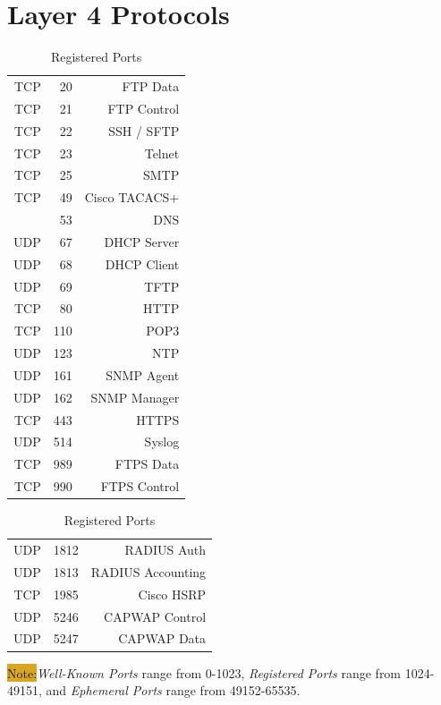 \documentclass[12pt]{article}
\newcommand{\note}[1]{\colorbox{#1}{Note:}}
\begin{document}
\section{Layer 4 Protocols \label{sec:L4}}
	\begin{table}[H]
	\begin{minipage}{.45\linewidth}
	\centering
	\caption{Well-Known Ports \label{tab:L4 PORTS KNOWN}}
	\begin{tabular}{| rr | r |}
	\hline
	TCP	& 20		& FTP Data\\
	TCP	& 21		& FTP Control\\\hline
	TCP	& 22		& SSH / SFTP\\\hline
	TCP	& 23		& Telnet\\\hline
	TCP	& 25		& SMTP\\\hline
	TCP	& 49		& Cisco TACACS+\\\hline
	       	& 53		& DNS\\\hline
	UDP	& 67		& DHCP Server\\
	UDP	& 68		& DHCP Client\\\hline
	UDP	& 69		& TFTP\\\hline
	TCP	& 80		& HTTP\\\hline
	TCP	& 110		& POP3\\\hline
	UDP	& 123		& NTP\\\hline
	UDP	& 161		& SNMP Agent\\
	UDP	& 162		& SNMP Manager\\\hline
	TCP	& 443		& HTTPS\\\hline
	UDP	& 514		& Syslog\\\hline
	TCP	& 989		& FTPS Data\\
	TCP	& 990		& FTPS Control\\\hline
	\end{tabular}\end{minipage}\hfill
	\begin{minipage}{.45\linewidth}
	\centering
	\caption{Registered Ports \label{tab:L4 PORTS REGISTERED}}
	\begin{tabular}{| cr | r |}
	\hline
	UDP	& 1812	& RADIUS Auth\\
	UDP	& 1813	& RADIUS Accounting\\\hline
	TCP	& 1985	& Cisco HSRP\\\hline
	UDP	& 5246	& CAPWAP Control\\
	UDP	& 5247	& CAPWAP Data\\\hline
	\end{tabular}\end{minipage}\end{table}
	\note{Goldenrod}\textit{Well-Known Ports} range from 0-1023, \textit{Registered Ports} range from 1024-49151, and \textit{Ephemeral Ports} range from 49152-65535.
\end{document}
